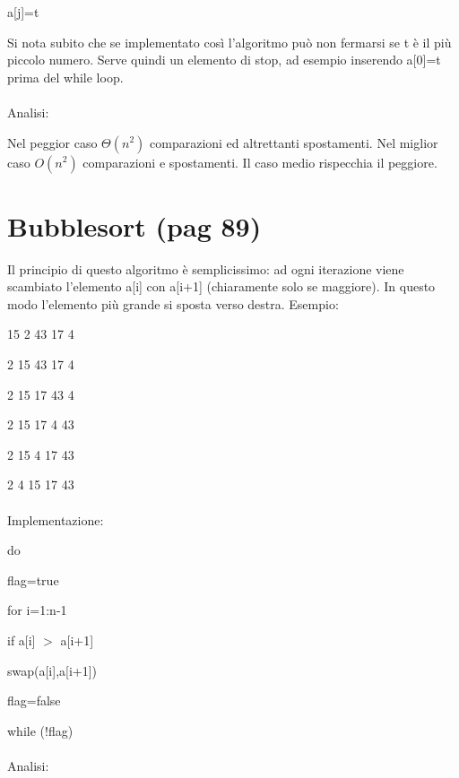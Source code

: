 \documentclass[12pt,a4paper]{book}
\begin{document}
\hspace{2em} a[j]=t

Si nota subito che se implementato così l'algoritmo può non fermarsi se t è il più piccolo numero. Serve quindi un elemento di stop, ad esempio inserendo a[0]=t prima del while loop.

\paragraph{}
Analisi:

Nel peggior caso $\Theta (n^2)$ comparazioni ed altrettanti spostamenti. Nel miglior caso $O(n^2)$ comparazioni e spostamenti. Il caso medio rispecchia il peggiore.

\section{Bubblesort (pag 89)}
Il principio di questo algoritmo è semplicissimo: ad ogni iterazione viene scambiato l'elemento a[i] con a[i+1] (chiaramente solo se maggiore). In questo modo l'elemento più grande si sposta verso destra. Esempio:

15 2 43 17 4

2 15 43 17 4

2 15 17 43 4

2 15 17 4 43

2 15 4 17 43

2 4 15 17 43

\paragraph{}Implementazione:

do

\hspace{2em} flag=true

\hspace{2em} for i=1:n-1

\hspace{2em} if a[i] $>$ a[i+1] 

\hspace{2em} \hspace{2em} swap(a[i],a[i+1])

\hspace{2em} \hspace{2em} flag=false

while (!flag)

\paragraph{}Analisi:
\end{document}
